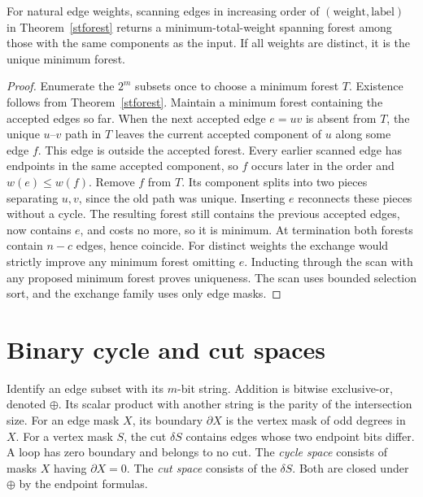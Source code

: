 \begin{theorem}\leavevmode\label{stkruskal}
For natural edge weights, scanning edges in increasing order of $(\text{weight},\text{label})$ in Theorem~\ref{stforest} returns a minimum-total-weight spanning forest among those with the same components as the input. If all weights are distinct, it is the unique minimum forest.
\end{theorem}
\begin{proof}
Enumerate the $2^m$ subsets once to choose a minimum forest $T$. Existence follows from Theorem~\ref{stforest}. Maintain a minimum forest containing the accepted edges so far. When the next accepted edge $e=uv$ is absent from $T$, the unique $u$--$v$ path in $T$ leaves the current accepted component of $u$ along some edge $f$. This edge is outside the accepted forest. Every earlier scanned edge has endpoints in the same accepted component, so $f$ occurs later in the order and $w(e)\le w(f)$. Remove $f$ from $T$. Its component splits into two pieces separating $u,v$, since the old path was unique. Inserting $e$ reconnects these pieces without a cycle. The resulting forest still contains the previous accepted edges, now contains $e$, and costs no more, so it is minimum. At termination both forests contain $n-c$ edges, hence coincide. For distinct weights the exchange would strictly improve any minimum forest omitting $e$. Inducting through the scan with any proposed minimum forest proves uniqueness. The scan uses bounded selection sort, and the exchange family uses only edge masks.
\end{proof}

\section{Binary cycle and cut spaces}
\label{stspaces}
Identify an edge subset with its $m$-bit string. Addition is bitwise exclusive-or, denoted $\oplus$. Its scalar product with another string is the parity of the intersection size. For an edge mask $X$, its boundary $\partial X$ is the vertex mask of odd degrees in $X$. For a vertex mask $S$, the cut $\delta S$ contains edges whose two endpoint bits differ. A loop has zero boundary and belongs to no cut. The \emph{cycle space} consists of masks $X$ having $\partial X=0$. The \emph{cut space} consists of the $\delta S$. Both are closed under $\oplus$ by the endpoint formulas.

